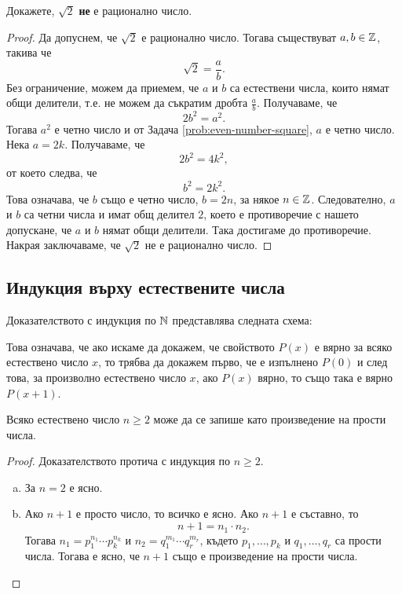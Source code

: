 \begin{problem}
  Докажете, $\sqrt{2}$ {\bf не} е рационално число.
\end{problem}
\begin{proof}
  Да допуснем, че $\sqrt{2}$ е рационално число. Тогава  съществуват $a,b \in \Z$, такива че
  \[\sqrt{2} = \frac{a}{b}.\]
  Без ограничение, можем да приемем, че $a$ и $b$ са естествени числа,
  които нямат общи делители, т.е. не можем да съкратим дробта $\frac{a}{b}$.
  Получаваме, че \[2b^2 = a^2.\]
  Тогава $a^2$ е четно число и от Задача \ref{prob:even-number-square}, $a$ е четно число.
  Нека $a = 2k$. Получаваме, че
  \[2b^2 = 4k^2,\]
  от което следва, че
  \[b^2 = 2k^2.\]
  Това означава, че $b$ също е четно число, $b = 2n$, за някое $n \in \Z$.
  Следователно, $a$ и $b$ са четни числа и имат общ делител $2$,
  което е противоречие с нашето допускане, че $a$ и $b$ нямат общи делители.
  Така достигаме до противоречие.
  Накрая заключаваме, че $\sqrt{2}$ не е рационално число.
\end{proof}


\subsection*{Индукция върху естествените числа}

Доказателството с индукция по $\Nat$ представлява следната схема:
\begin{prooftree}
\end{prooftree}

Това означава, че ако искаме да докажем, че свойството $P(x)$ е вярно за всяко естествено число $x$,
то трябва да докажем първо, че е изпълнено $P(0)$ и след това, за произволно естествено число $x$, ако $P(x)$ вярно, то също така е вярно $P(x+1)$.

\begin{problem}
  \label{prob:number-prod-prime}  
  Всяко естествено число $n \geq 2$ може да се запише като произведение на прости числа.
\end{problem}
\begin{proof}
  Доказателството протича с индукция по $n \geq 2$.
  \begin{enumerate}[a)]
  \item 
    За $n = 2$  е ясно.
  \item
    Ако $n+1$ е просто число, то всичко е ясно.
    Ако $n+1$ е съставно, то \[n + 1 = n_1\cdot n_2.\]
    Тогава $n_1 = p^{n_1}_1\cdots p^{n_k}_k$ и $n_2 = q^{m_1}_1\cdots q^{m_r}_r$,
    където $p_1,\dots,p_k$ и $q_1,\dots,q_r$ са прости числа.
    Тогава е ясно, че $n+1$ също е произведение на прости числа.
  \end{enumerate}
\end{proof}

